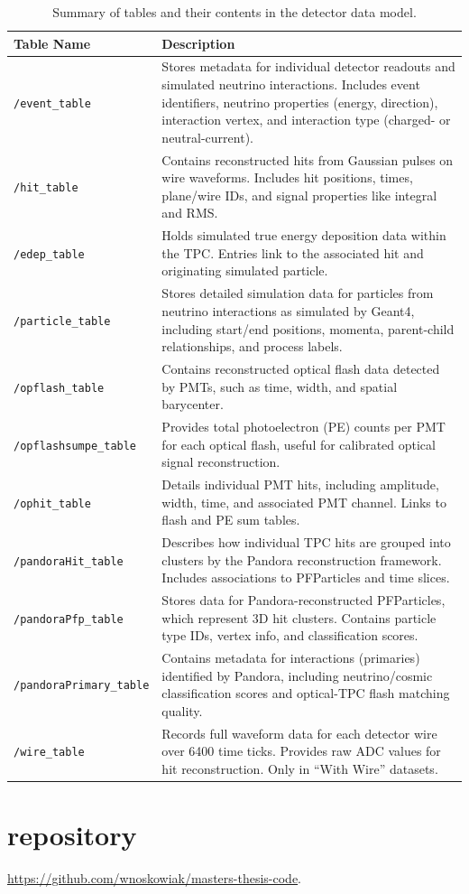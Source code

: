 \documentclass{pracalicmgr}
\begin{document}
\begin{table}[H]
\centering
\caption{Summary of tables and their contents in the detector data model.}
\begin{tabular}{|l|p{10.0cm}|}
\hline
\textbf{Table Name} & \textbf{Description} \\
\hline
\texttt{/event\_table} & Stores metadata for individual detector readouts and simulated neutrino interactions. Includes event identifiers, neutrino properties (energy, direction), interaction vertex, and interaction type (charged- or neutral-current). \\
\hline
\texttt{/hit\_table} & Contains reconstructed hits from Gaussian pulses on wire waveforms. Includes hit positions, times, plane/wire IDs, and signal properties like integral and RMS. \\
\hline
\texttt{/edep\_table} & Holds simulated true energy deposition data within the TPC. Entries link to the associated hit and originating simulated particle. \\
\hline
\texttt{/particle\_table} & Stores detailed simulation data for particles from neutrino interactions as simulated by Geant4, including start/end positions, momenta, parent-child relationships, and process labels. \\
\hline
\texttt{/opflash\_table} & Contains reconstructed optical flash data detected by PMTs, such as time, width, and spatial barycenter. \\
\hline
\texttt{/opflashsumpe\_table} & Provides total photoelectron (PE) counts per PMT for each optical flash, useful for calibrated optical signal reconstruction. \\
\hline
\texttt{/ophit\_table} & Details individual PMT hits, including amplitude, width, time, and associated PMT channel. Links to flash and PE sum tables. \\
\hline
\texttt{/pandoraHit\_table} & Describes how individual TPC hits are grouped into clusters by the Pandora reconstruction framework. Includes associations to PFParticles and time slices. \\
\hline
\texttt{/pandoraPfp\_table} & Stores data for Pandora-reconstructed PFParticles, which represent 3D hit clusters. Contains particle type IDs, vertex info, and classification scores. \\
\hline
\texttt{/pandoraPrimary\_table} & Contains metadata for interactions (primaries) identified by Pandora, including neutrino/cosmic classification scores and optical-TPC flash matching quality. \\
\hline
\texttt{/wire\_table} & Records full waveform data for each detector wire over 6400 time ticks. Provides raw ADC values for hit reconstruction. Only in ``With Wire'' datasets. \\
\hline
\end{tabular}
\label{tab:data_tables}
\end{table}

\section*{repository}
\url{https://github.com/wnoskowiak/masters-thesis-code}.

\newpage
\end{document}
